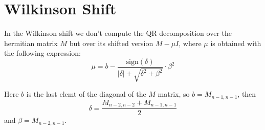 \documentclass{scrartcl}
\begin{document}
\section{Wilkinson Shift}
In the Wilkinson shift we don't compute the QR decomposition over the hermitian matrix $M$ but over its shifted version $M - \mu I$, where $\mu$ is obtained with the following expression:
\[
    \mu = b - \frac{\text{sign}(\delta)}{|\delta| + \sqrt{\delta^2 + \beta^2}} \cdot \beta^2
\]

Here $b$ is the last elemt of the diagonal of the $M$ matrix, so $b = M_{n-1,n-1}$, then
\[
\delta = \frac{M_{n-2,n-2} + M_{n-1,n-1}}{2}
\]
and $\beta = M_{n-2,n-1}$.
\end{document}
